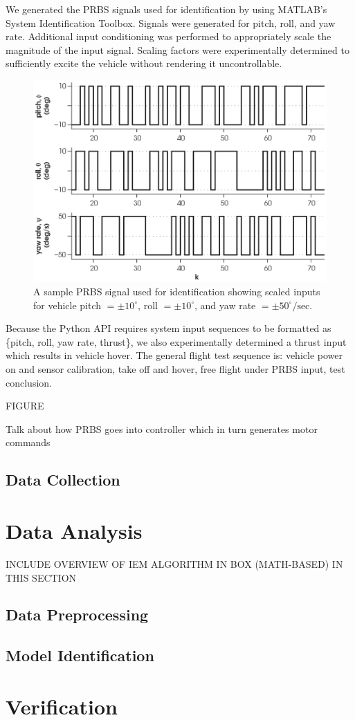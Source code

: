 We generated the PRBS signals used for identification by using MATLAB's System Identification Toolbox. Signals were generated for pitch, roll, and yaw rate. Additional input conditioning was performed to appropriately scale the magnitude of the input signal. Scaling factors were experimentally determined to sufficiently excite the vehicle without rendering it uncontrollable.
\begin{figure}[htb!]
	\centering
	\includegraphics{../fig/test_prbs.eps}
	\caption[A sample PRBS signal used for identification showing scaled inputs for vehicle pitch, roll, and yaw rate.]{A sample PRBS signal used for identification showing scaled inputs for vehicle pitch $= \pm 10^\circ$, roll $= \pm 10^\circ$, and yaw rate $= \pm 50^\circ/\mbox{sec}$.}
\end{figure}

Because the Python API requires system input sequences to be formatted as \{pitch, roll, yaw rate, thrust\}, we also experimentally determined a thrust input which results in vehicle hover. The general flight test sequence is: vehicle power on and sensor calibration, take off and hover, free flight under PRBS input, test conclusion.

FIGURE


Talk about how PRBS goes into controller which in turn generates motor commands
\subsection{Data Collection}





\section{Data Analysis}
INCLUDE OVERVIEW OF IEM ALGORITHM IN BOX (MATH-BASED) IN THIS SECTION

\subsection{Data Preprocessing}

\subsection{Model Identification}

\section{Verification}